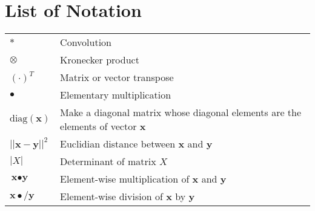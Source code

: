 \chapter* {List of Notation}

\begin{tabular}{p{100pt}p{300pt}}
    $\ast$ & Convolution\\
    $\otimes$ & Kronecker product\\
    $(\cdot)^T$ & Matrix or vector transpose\\
    $\bullet$ & Elementary multiplication\\
    $\textrm{diag}(\textbf{x})$ & Make a diagonal matrix whose diagonal elements are the elements of vector \textbf{x}\\
    $||\textbf{x}-\textbf{y}||^2$ & Euclidian distance between \textbf{x} and \textbf{y}\\
    $|X|$ & Determinant of matrix $X$\\
    $\textbf{x}\bullet\textbf{y}$ & Element-wise multiplication of \textbf{x} and \textbf{y}\\
    $\textbf{x}\bullet/\textbf{y}$ & Element-wise division of \textbf{x} by \textbf{y}\\
\end{tabular}
